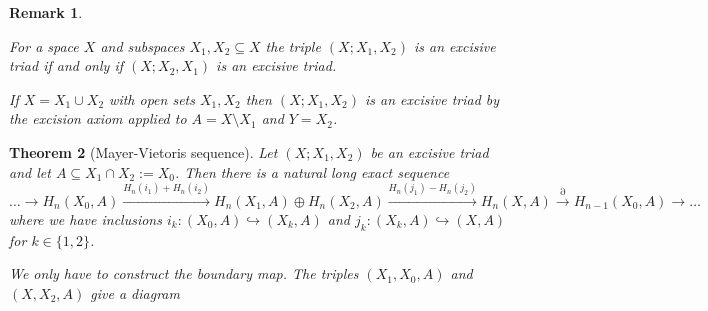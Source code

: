 \documentclass[11pt]{book}
\numberwithin{dummy}{section}
\newtheorem{theorem}{Theorem}[section]
\newtheorem{remark}[theorem]{Remark}
\theoremstyle{nonumberbreak}
\newenvironment{defin}[1][]{\ifthenelse{\equal{#1}{}}{\definition}{\definition[#1]}\rm}{\enddefinition}
\newenvironment{pr}[1][]{\ifthenelse{\equal{#1}{}}{\proof}{\proof[#1]}\rm}{\endproof}
\begin{document}
\begin{spacing}{1.4}
\begin{defin}
\end{defin}


\begin{remark}
\begin{compactenum}
\item For a space $X$ and subspaces $X_1, X_2 \subseteq X$ the triple $(X;X_1,X_2)$ is an excisive triad if and only if $(X;X_2,X_1)$ is an excisive triad.
\item If $X= X_1 \cup X_2$ with open sets $X_1, X_2$ then $(X;X_1,X_2)$ is an excisive triad by the excision axiom applied to $A= X\setminus X_1$ and $Y=X_2$.
\end{compactenum}
\end{remark}




\begin{theorem}[Mayer-Vietoris sequence]
Let $(X;X_1,X_2)$ be an excisive triad and let $A \subseteq X_1 \cap X_2 := X_0$. Then there is a natural long exact sequence
$$\ldots \rightarrow H_n(X_0,A) \xrightarrow{H_n(i_1) + H_n(i_2)} H_n(X_1,A) \oplus H_n(X_2,A) \xrightarrow{H_n(j_1) - H_n(j_2)} H_n(X,A) \xrightarrow{\partial} H_{n-1}(X_0,A) \rightarrow \ldots $$
where we have inclusions $i_k: (X_0,A) \hookrightarrow (X_k,A)$ and $j_k: (X_k,A) \hookrightarrow (X,A)$ for $k \in \{1,2\}$.

\begin{pr}
We only have to construct the boundary map. The triples $(X_1,X_0,A)$ and $(X,X_2,A)$ give a diagram


\end{pr}
\end{theorem}
\end{spacing}
\end{document}
